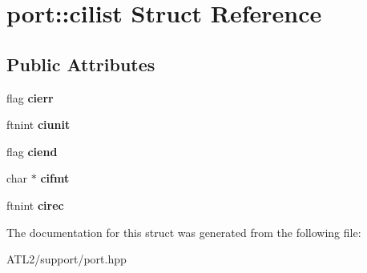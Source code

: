 \hypertarget{structport_1_1cilist}{\section{port\+:\+:cilist Struct Reference}
\label{structport_1_1cilist}
}
\subsection*{Public Attributes}
\begin{DoxyCompactItemize}
\item 
\hypertarget{structport_1_1cilist_a37ef3e093cc1499d9a1c5861ff94da70}{flag {\bfseries cierr}}\label{structport_1_1cilist_a37ef3e093cc1499d9a1c5861ff94da70}

\item 
\hypertarget{structport_1_1cilist_a4e82c4880add9dd19da4b5b8fa5253f9}{ftnint {\bfseries ciunit}}\label{structport_1_1cilist_a4e82c4880add9dd19da4b5b8fa5253f9}

\item 
\hypertarget{structport_1_1cilist_a70b7a94c399007378ef31fa5026de9da}{flag {\bfseries ciend}}\label{structport_1_1cilist_a70b7a94c399007378ef31fa5026de9da}

\item 
\hypertarget{structport_1_1cilist_a12514af102d5f7c132d6e328a6764395}{char $\ast$ {\bfseries cifmt}}\label{structport_1_1cilist_a12514af102d5f7c132d6e328a6764395}

\item 
\hypertarget{structport_1_1cilist_ab341f7c9a6369780b66dac60baf48002}{ftnint {\bfseries cirec}}\label{structport_1_1cilist_ab341f7c9a6369780b66dac60baf48002}

\end{DoxyCompactItemize}


The documentation for this struct was generated from the following file\+:\begin{DoxyCompactItemize}
\item 
A\+T\+L2/support/port.\+hpp\end{DoxyCompactItemize}

